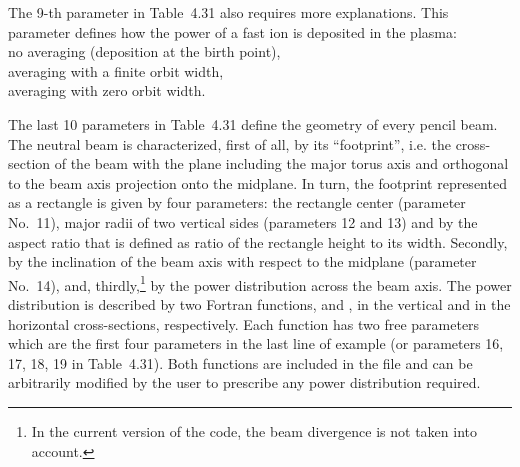 The 9-th parameter in Table~4.31 also requires more explanations.
This parameter defines how the power of a fast ion is deposited in the
plasma: \\
\hspace*{1em}{\tt $=0$} no averaging (deposition at the birth point),\\
\hspace*{1em}{\tt $=1$} averaging with a finite orbit width,\\
\hspace*{1em}{\tt $=2$} averaging with zero orbit width.\\
\vspace*{-1ex}

The last 10 parameters in Table~4.31 define the geometry of every pencil
beam.
The neutral beam is characterized, first of all, by its ``footprint'',
i.e. the cross-section of the beam with the plane including the major
torus axis and orthogonal to the beam axis projection onto the midplane.
In turn, the footprint represented as a rectangle is given by four
parameters: the rectangle center (parameter No.~11), major radii of two
vertical sides (parameters 12 and 13) and by the aspect ratio that is
defined as ratio of the rectangle height to its width.
Secondly, by the inclination of the beam axis with respect to the
midplane (parameter No.~14), and, thirdly,\footnote
{In the current version of the code, the beam divergence is not taken
into account.}
by the power distribution across the beam axis.
The power distribution is described by two Fortran functions,
 and , in the vertical and in the horizontal
cross-sections, respectively. 
Each function has two free parameters which are the first four
parameters in the last line of example  (or parameters 16,
17, 18, 19 in Table~4.31). 
Both functions are included in the file  and can
be arbitrarily modified by the user to prescribe any power distribution
required. 

